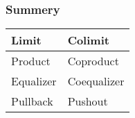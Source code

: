 \documentclass{beamer}
\begin{document}
\begin{frame}
  \frametitle{Summery}
    \begin{table}
    \begin{tabular}{l | l}
      Limit & Colimit \\ \hline
      Product & Coproduct \\
      Equalizer & Coequalizer \\
      Pullback & Pushout
    \end{tabular}
    \end{table}
\end{frame}
\end{document}
